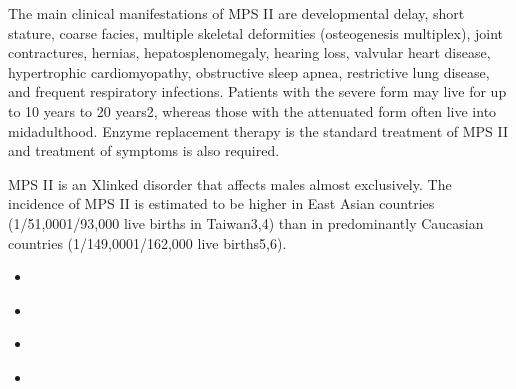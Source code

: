 \documentclass[letterpaper,10pt,english]{jupyterBook}
\begin{document}
\sphinxAtStartPar
The main clinical manifestations of MPS II are developmental delay, short stature, coarse facies, multiple skeletal deformities (osteogenesis multiplex), joint contractures, hernias, hepatosplenomegaly, hearing loss, valvular heart disease, hypertrophic cardiomyopathy, obstructive sleep apnea, restrictive lung disease, and frequent respiratory infections. Patients with the severe form may live for up to 10 years to 20 years2, whereas those with the attenuated form often live into mid\sphinxhyphen{}adulthood. Enzyme replacement therapy is the standard treatment of MPS II and treatment of symptoms is also required.

\sphinxAtStartPar
MPS II is an X\sphinxhyphen{}linked disorder that affects males almost exclusively. The incidence of MPS II is estimated to be higher in East Asian countries (1/51,000\sphinxhyphen{}1/93,000 live births in Taiwan3,4) than in predominantly Caucasian countries (1/149,000\sphinxhyphen{}1/162,000 live births5,6).

\begin{DUlineblock}{0em}
\item[] 
\end{DUlineblock}

\begin{sphinxVerbatim}[commandchars=\\\{\}]
\end{sphinxVerbatim}

\begin{DUlineblock}{0em}
\item[] 
\end{DUlineblock}
\begin{itemize}
\item {} 
\sphinxAtStartPar
{\hyperref[\detokenize{ipynb/chapter1::doc}]{}}

\item {} 
\sphinxAtStartPar
{\hyperref[\detokenize{ipynb/chapter2::doc}]{}}

\item {} 
\sphinxAtStartPar
{\hyperref[\detokenize{ipynb/chapter3::doc}]{}}

\item {} 
\sphinxAtStartPar
{\hyperref[\detokenize{ipynb/chapter4::doc}]{}}

\end{itemize}
\end{document}
